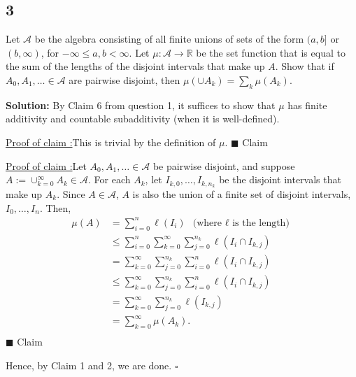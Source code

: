 \documentclass[12pt]{article}
\newcounter{ProofCounter}
\newcounter{ClaimCounter}[ProofCounter]
\newenvironment{Solution}{\stepcounter{ProofCounter}\textbf{Solution:}}{\hfill$\square$}
\newenvironment{claim}[1]{\vspace{1mm}\stepcounter{ClaimCounter}\par\noindent\underline{\bf Claim \theClaimCounter:}\space#1}{}
\newenvironment{claimproof}[1]{\par\noindent\underline{Proof of claim \theClaimCounter:}\space#1}{\hfill $\blacksquare$ Claim \theClaimCounter}
\begin{document}
\subsection*{3}
\begin{tcolorbox}
  Let $\mathcal{A}$ be the algebra consisting of all finite unions of sets of the form $(a,b]$ or $(b, \infty)$, for $-\infty \leq a, b < \infty$.
  Let $\mu : \mathcal{A} \rightarrow \mathbb{R}$ be the set function that is equal to the sum of the lengths of the disjoint intervals that make up $A$.
  Show that if $A_0, A_1, \dots \in \mathcal{A}$ are pairwise disjoint, then $\mu( \cup A_k ) = \sum_k \mu(A_k)$.
\end{tcolorbox}
\begin{Solution}
  By Claim 6 from question 1, it suffices to show that $\mu$ has finite additivity and countable subadditivity (when it is well-defined).

  \begin{claimproof}
    This is trivial by the definition of $\mu$.
  \end{claimproof}

  \begin{claimproof}
    Let $A_0, A_1, \dots \in \mathcal{A}$ be pairwise disjoint, and suppose $A := \cup_{k=0}^{\infty} A_k \in \mathcal{A}$. For each $A_k$, let $I_{k,0}, \dots, I_{k,n_k}$ be the disjoint intervals that make up $A_k$. Since $A \in \mathcal{A}$, $A$ is also the union of a finite set of disjoint intervals, $I_0, \dots, I_n$.
    Then,
    \begin{align*}
      \mu(A) & = \sum_{i=0}^{n} \ell(I_i) \ \ \text{(where $\ell$ is the length)}\\
      & \leq \sum_{i=0}^{n} \sum_{k=0}^{\infty} \sum_{j=0}^{n_k} \ell( I_i \cap I_{k,j}) \\ 
      & = \sum_{k=0}^{\infty} \sum_{j=0}^{n_k} \sum_{i=0}^{n} \ell( I_i \cap I_{k,j}) \\ 
      & \leq \sum_{k=0}^{\infty} \sum_{j=0}^{n_k} \sum_{i=0}^{n} \ell( I_i \cap I_{k,j}) \\ 
      & = \sum_{k=0}^{\infty} \sum_{j=0}^{n_k} \ell( I_{k,j}) \\ 
      & = \sum_{k=0}^{\infty} \mu(A_k). \\ 
    \end{align*}
  \end{claimproof}

  Hence, by Claim 1 and 2, we are done.
\end{Solution}
\end{document}
